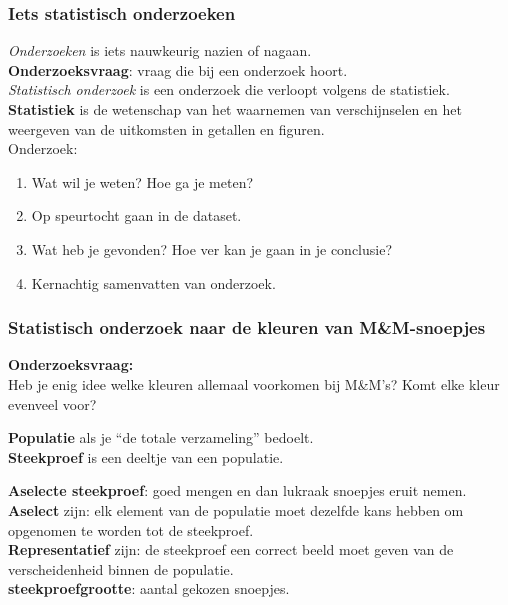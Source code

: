 \documentclass[dutch]{beamer}
\begin{document}
\small

\begin{frame}
 \frametitle{Iets statistisch onderzoeken}
 {\it Onderzoeken} is iets nauwkeurig nazien of nagaan.\\
 {\bf Onderzoeksvraag}: vraag die bij een onderzoek hoort.\\
 {\it Statistisch onderzoek} is een onderzoek die verloopt volgens de statistiek.\\
 {\bf Statistiek} is de wetenschap van het waarnemen van verschijnselen en het weergeven van de uitkomsten in getallen en figuren.\\
 Onderzoek:\\
 \begin{enumerate}
  \item Wat wil je weten? Hoe ga je meten?
  \item Op speurtocht gaan in de dataset.
  \item Wat heb je gevonden? Hoe ver kan je gaan in je conclusie?
  \item Kernachtig samenvatten van onderzoek.
\end{enumerate}
\end{frame}

\begin{frame}
\frametitle{Statistisch onderzoek naar de kleuren van M\&M-snoepjes}
{\bf Onderzoeksvraag:}\\
Heb je enig idee welke kleuren allemaal voorkomen bij M\&M’s?
Komt elke kleur evenveel voor?\\\vspace*{0.5cm}

{\bf Populatie} als je “de totale verzameling” bedoelt.\\
{\bf Steekproef} is een deeltje van een populatie.\\\vspace*{0.5cm}

{\bf Aselecte steekproef}: goed mengen en dan lukraak snoepjes eruit nemen.\\
{\bf Aselect} zijn: elk element van de populatie moet dezelfde kans hebben om opgenomen te worden tot de steekproef.\\
{\bf Representatief} zijn: de steekproef een correct beeld moet geven van de verscheidenheid binnen de populatie.\\
{\bf steekproefgrootte}: aantal gekozen snoepjes.

\end{frame}
\end{document}
